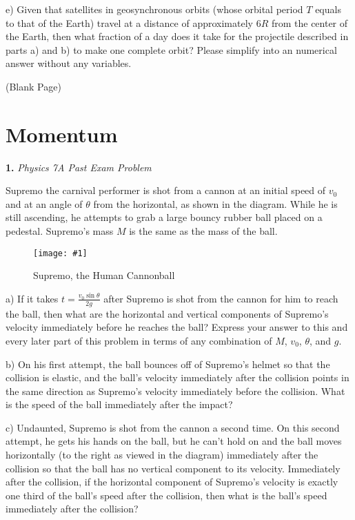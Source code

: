\documentclass[11pt]{article}
\newcommand{\fig}[4]{
    \begin{figure}[H]
        \centering
        \texttt{[image: \#1]}
        \caption{#2}
        \label{exp4fit}
    \end{figure}
}
\theoremstyle{gangnamstyle}{\newtheorem{definition}{Definition}[]}
\theoremstyle{gangnamstyle}{\newtheorem{example}{Example}[]}
\theoremstyle{gangnamstyle}{\newtheorem{problem}{Problem}[]}
\begin{document}
e) Given that satellites in geosynchronous orbits (whose orbital period $T$ equals to that of the Earth) travel at a distance of approximately $6R$ from the center of the Earth, then what fraction of a day does it take for the projectile described in parts a) and b) to make one complete orbit? Please simplify into an numerical answer without any variables. 

\pagebreak

\begin{center}
(Blank Page)
\end{center}

\pagebreak

\section{Momentum}

\textbf{1.} \textit{Physics 7A Past Exam Problem}

Supremo the carnival performer is shot from a cannon at an initial speed of $v_0$ and at an angle of $\theta$ from the horizontal, as shown in the diagram. While he is still ascending, he attempts to grab a large bouncy rubber ball placed on a pedestal. Supremo’s mass $M$ is the same as the mass of the ball.

\fig{figs/mt2/deweese4.png}{Supremo, the Human Cannonball}{0.5}{0}

a) If it takes $t = \frac{v_0\sin\theta}{2g}$ after Supremo is shot from the cannon for him to reach the ball, then what are the horizontal and vertical components of Supremo’s velocity immediately before he reaches the ball? Express your answer to this and every later part of this problem in terms of any combination of $M$, $v_0$, $\theta$, and $g$.

b) On his first attempt, the ball bounces off of Supremo’s helmet so that the collision is elastic, and the ball’s velocity immediately after the collision points in the same direction as Supremo’s velocity immediately before the collision. What is the speed of the ball immediately after the impact?

c) Undaunted, Supremo is shot from the cannon a second time. On this second attempt, he gets his hands on the ball, but he can’t hold on and the ball moves horizontally (to the right as viewed in the diagram) immediately after the collision so that the ball has no vertical component to its velocity. Immediately after the collision, if the horizontal component of Supremo’s velocity is exactly one third of the ball’s speed after the collision, then what is the ball’s speed immediately after the collision?
\end{document}
